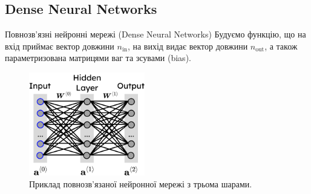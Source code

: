 \documentclass{zkdl-presentation-template}
\begin{document}
    \subsection{Dense Neural Networks}
    \begin{frame}{Повнозв'язні нейронні мережі (Dense Neural Networks)}
        Будуємо функцію, що на вхід приймає вектор довжини $n_{\text{in}}$, на вихід видає вектор довжини $n_{\text{out}}$, а також параметризована матрицями ваг та зсувами (bias).
        \begin{figure}
            \centering
            \includegraphics[width=0.45\textwidth]{images/flat_network.png}
            \caption{Приклад повнозв'язаної нейронної мережі з трьома шарами.}
        \end{figure}
    \end{frame}
\end{document}
